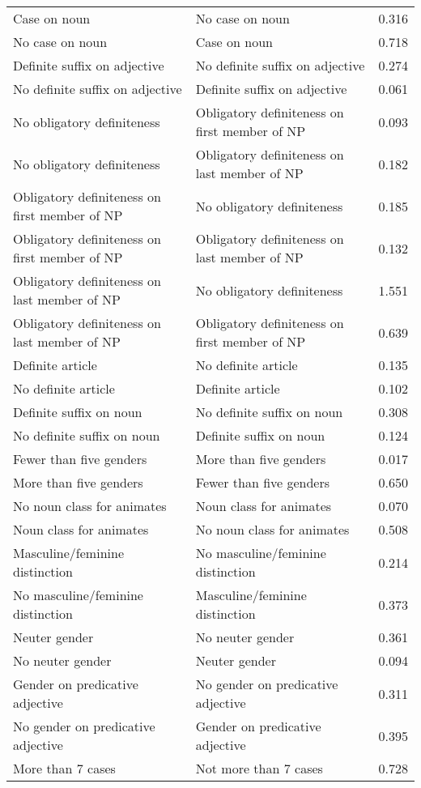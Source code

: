 \begin{longtable}{p{.4\linewidth}p{.4\linewidth}p{.1\linewidth}}
Case on noun & No case on noun & 0.316\\
No case on noun & Case on noun & 0.718\\
Definite suffix on adjective & No definite suffix on adjective & 0.274\\
No definite suffix on adjective & Definite suffix on adjective & 0.061\\
No obligatory definiteness & Obligatory definiteness on first member of NP & 0.093\\
No obligatory definiteness & Obligatory definiteness on last member of NP & 0.182\\
Obligatory definiteness on first member of NP & No obligatory definiteness & 0.185\\
Obligatory definiteness on first member of NP & Obligatory definiteness on last member of NP & 0.132\\
Obligatory definiteness on last member of NP & No obligatory definiteness & 1.551\\
Obligatory definiteness on last member of NP & Obligatory definiteness on first member of NP & 0.639\\
Definite article & No definite article & 0.135\\
No definite article & Definite article & 0.102\\
Definite suffix on noun & No definite suffix on noun & 0.308\\
No definite suffix on noun & Definite suffix on noun & 0.124\\
Fewer than five genders & More than five genders & 0.017\\
More than five genders & Fewer than five genders & 0.650\\
No noun class for animates & Noun class for animates & 0.070\\
Noun class for animates & No noun class for animates & 0.508\\
Masculine/feminine distinction & No masculine/feminine distinction & 0.214\\
No masculine/feminine distinction & Masculine/feminine distinction & 0.373\\
Neuter gender & No neuter gender & 0.361\\
No neuter gender & Neuter gender & 0.094\\
Gender on predicative adjective & No gender on predicative adjective & 0.311\\
No gender on predicative adjective & Gender on predicative adjective & 0.395\\
More than 7 cases & Not more than 7 cases & 0.728\\

\end{longtable}
